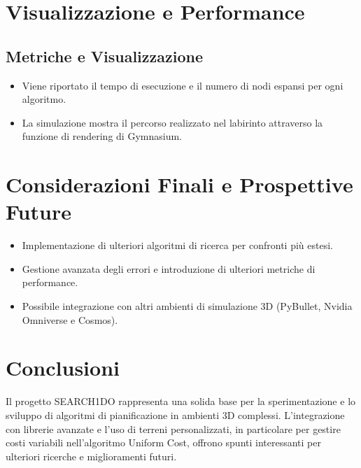 \documentclass[12pt,a4paper]{article}
\begin{document}
\section{Visualizzazione e Performance}
\subsection*{Metriche e Visualizzazione}
\begin{itemize}
    \item Viene riportato il tempo di esecuzione e il numero di nodi espansi per ogni algoritmo.
    \item La simulazione mostra il percorso realizzato nel labirinto attraverso la funzione di rendering di Gymnasium.
\end{itemize}

\section{Considerazioni Finali e Prospettive Future}
\begin{itemize}
    \item Implementazione di ulteriori algoritmi di ricerca per confronti più estesi.
    \item Gestione avanzata degli errori e introduzione di ulteriori metriche di performance.
    \item Possibile integrazione con altri ambienti di simulazione 3D (PyBullet, Nvidia Omniverse e Cosmos).
\end{itemize}

\section{Conclusioni}
Il progetto SEARCH1DO rappresenta una solida base per la sperimentazione e lo sviluppo di algoritmi di pianificazione in ambienti 3D complessi. L'integrazione con librerie avanzate e l'uso di terreni personalizzati, in particolare per gestire costi variabili nell'algoritmo Uniform Cost, offrono spunti interessanti per ulteriori ricerche e miglioramenti futuri.
\end{document}
